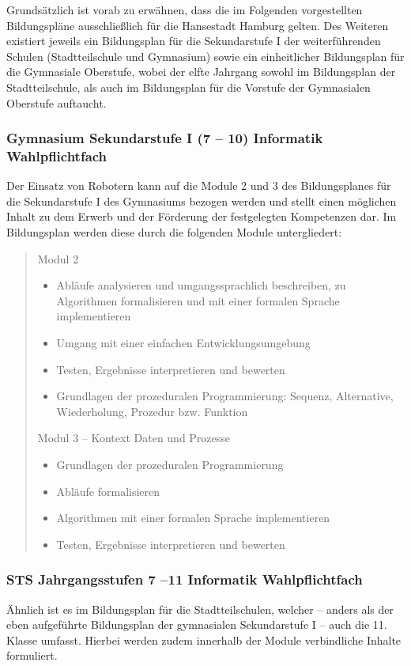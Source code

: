 \documentclass[paper=a4, DIV=calc, BCOR=12mm, twoside=on, onecolumn=on, open = right, titlepage =on, parskip =half-, headsepline = on, footsepline = off, chapterprefix = off, appendixprefix = on, fontsize = 12pt, numbers = noenddot, abstract = on]{scrbook}
\begin{document}
Grundsätzlich ist vorab zu erwähnen, dass die im Folgenden vorgestellten Bildungspläne ausschließlich für die Hansestadt Hamburg gelten. Des Weiteren existiert jeweils ein Bildungsplan für die Sekundarstufe I der weiterführenden Schulen (Stadtteilschule und Gymnasium) sowie ein einheitlicher Bildungsplan für die Gymnasiale Oberstufe, wobei der elfte Jahrgang sowohl im Bildungsplan der Stadtteilschule, als auch im Bildungsplan für die Vorstufe der Gymnasialen Oberstufe auftaucht. 
\subsubsection{Gymnasium Sekundarstufe I (7 -- 10) Informatik Wahlpflichtfach}
Der Einsatz von Robotern kann auf die Module 2 und 3 des Bildungsplanes für die Sekundarstufe I des Gymnasiums bezogen werden und stellt einen möglichen Inhalt zu dem Erwerb und der Förderung der festgelegten Kompetenzen dar. Im Bildungsplan werden diese durch die folgenden Module untergliedert:
\clearpage

 \begin{quote}
Modul 2
\begin{itemize}
\item Abläufe analysieren und umgangssprachlich beschreiben, zu Algorithmen formalisieren und mit einer formalen Sprache implementieren
\item Umgang mit einer einfachen Entwicklungsumgebung
\item Testen, Ergebnisse interpretieren und bewerten
\item Grundlagen der prozeduralen Programmierung: Sequenz, Alternative, Wiederholung, Prozedur bzw. Funktion
\end{itemize}

Modul 3 -- Kontext Daten und Prozesse
\begin{itemize}
\item Grundlagen der prozeduralen Programmierung
\item Abläufe formalisieren
\item Algorithmen mit einer formalen Sprache implementieren
\item Testen, Ergebnisse interpretieren und bewerten \qquad \cite{gymsek1:11} 
\end{itemize}
 \end{quote}


\subsubsection{STS Jahrgangsstufen 7 --11 Informatik Wahlpflichtfach}
Ähnlich ist es im Bildungsplan für die Stadtteilschulen, welcher -- anders als der eben aufgeführte Bildungsplan der gymnasialen Sekundarstufe I -- auch die 11. Klasse umfasst. Hierbei werden zudem innerhalb der Module verbindliche Inhalte formuliert.
\end{document}
